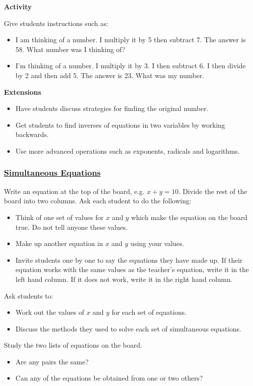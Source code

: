 		\noindent \textbf{Activity}
		
		\noindent Give students instructions such as:
		\begin{itemize}
		\item I am thinking of a number. I multiply it by 5 then subtract 7. The answer is 58. What number was I thinking of?
		\item I'm thinking of a number. I multiply it by 3. I then subtract 6. I then divide by 2 and then add 5. The answer is 23. What was my number.	
		\end{itemize}
		
		\noindent \textbf{Extensions}
		\begin{itemize}
		\item Have students discuss strategies for finding the original number.
		\item Get students to find inverses of equations in two variables by working backwards.
		\item Use more advanced operations such as exponents, radicals and logarithms.
		\end{itemize}
		
		\subsubsection{\underline{Simultaneous Equations}}
		Write an equation at the top of the board, e.g. $x + y = 10$. Divide the rest of the board into two columns. Ask each student to do the following:
		\begin{itemize}
		\item Think of one set of values for $x$ and $y$ which make the equation on the board true. Do not tell anyone these values.
		\item Make up another equation in $x$ and $y$ using your values.
		\item Invite students one by one to say the equations they have made up. If their equation works with the same values as the teacher's equation, write it in the left hand column. If it does not work, write it in the right hand column.		
	\end{itemize}
	
\noindent Ask students to:
	\begin{itemize}
	\item Work out the values of $x$ and $y$ for each set of equations.
	\item Discuss the methods they used to solve each set of simultaneous equations.
	\end{itemize}
Study the two lists of equations on the board. 
	\begin{itemize}
	\item Are any pairs the same? 
	\item Can any of the equations be obtained from one or two others?
	\end{itemize}
	
